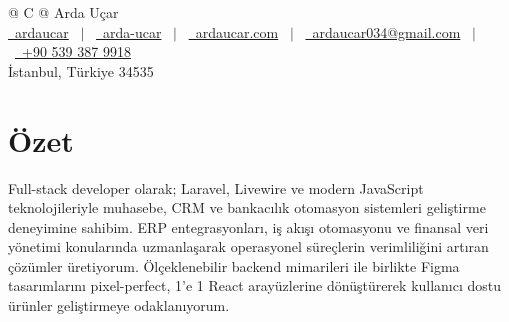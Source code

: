 \documentclass[a4paper,12pt]{article}
\begin{document}
\pagestyle{empty} 



\begin{tabularx}{\linewidth}{@{} C @{}}
\Huge{Arda Uçar} \\[7.5pt]
\href{https://github.com/ardaucar}{\raisebox{-0.05\height}\faGithub\ ardaucar} \ $|$ \ 
\href{https://www.linkedin.com/in/arda-ucar/}{\raisebox{-0.05\height}\faLinkedin\ arda-ucar} \ $|$ \ 
\href{https://ardaucar.com}{\raisebox{-0.05\height}\faGlobe \ ardaucar.com} \ $|$ \ 
\href{mailto:ardaucar034@gmail.com}{\raisebox{-0.05\height}\faEnvelope \ ardaucar034@gmail.com} \ $|$ \ 
\href{tel:+905393879918}{\raisebox{-0.05\height}\faMobile \ +90 539 387 9918} \\
{\small İstanbul, Türkiye 34535}
\end{tabularx}


\section{Özet}
Full-stack developer olarak; Laravel, Livewire ve modern JavaScript teknolojileriyle muhasebe, CRM ve bankacılık otomasyon sistemleri geliştirme deneyimine sahibim. ERP entegrasyonları, iş akışı otomasyonu ve finansal veri yönetimi konularında uzmanlaşarak operasyonel süreçlerin verimliliğini artıran çözümler üretiyorum. Ölçeklenebilir backend mimarileri ile birlikte Figma tasarımlarını pixel-perfect, 1’e 1 React arayüzlerine dönüştürerek kullanıcı dostu ürünler geliştirmeye odaklanıyorum.
\end{document}
